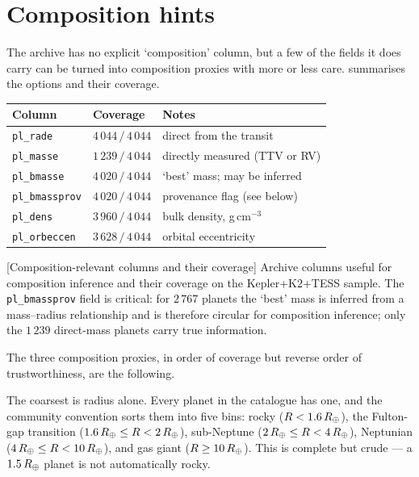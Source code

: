 \section{Composition hints}
\label{sec:kt_composition}

The archive has no explicit `composition' column, but a few of the
fields it does carry can be turned into composition proxies with more
or less care.   summarises the
options and their coverage.

\begin{center}
\small
\begin{tabular}{lll}
    \toprule
    Column & Coverage & Notes \\
    \midrule
    \texttt{pl\_rade}    & $4\,044\,/\,4\,044$ & direct from the transit \\
    \texttt{pl\_masse}   & $1\,239\,/\,4\,044$ & directly measured (TTV or RV) \\
    \texttt{pl\_bmasse}  & $4\,020\,/\,4\,044$ & `best' mass; may be inferred \\
    \texttt{pl\_bmassprov} & $4\,020\,/\,4\,044$ & provenance flag (see below) \\
    \texttt{pl\_dens}    & $3\,960\,/\,4\,044$ & bulk density, g\,cm$^{-3}$ \\
    \texttt{pl\_orbeccen} & $3\,628\,/\,4\,044$ & orbital eccentricity \\
    \bottomrule
\end{tabular}
[Composition-relevant columns and their coverage]{%
    Archive columns useful for composition inference and their coverage
    on the Kepler+K2+TESS sample.  The \texttt{pl\_bmassprov} field is
    critical: for $2\,767$ planets the `best' mass is inferred from a
    mass--radius relationship and is therefore circular for
    composition inference; only the $1\,239$ direct-mass planets carry
    true information.}
\label{tab:kt_composition_coverage}
\end{center}

The three composition proxies, in order of coverage but reverse
order of trustworthiness, are the following.

The coarsest is radius alone.  Every planet in the catalogue has
one, and the community convention
\parencite{Fulton2017,ChenKipping2017} sorts them into five bins:
rocky ($R<1.6\,R_{\oplus}$), the Fulton-gap transition
($1.6\,R_{\oplus}\leq R<2\,R_{\oplus}$), sub-Neptune
($2\,R_{\oplus}\leq R<4\,R_{\oplus}$), Neptunian
($4\,R_{\oplus}\leq R<10\,R_{\oplus}$), and gas giant
($R\geq 10\,R_{\oplus}$).  This is complete but crude --- a
$1.5\,R_{\oplus}$ planet is not automatically rocky.

